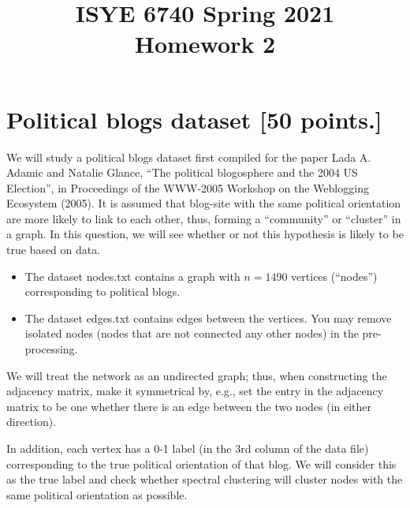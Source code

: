 \documentclass[twoside,10pt]{article}
\begin{document}
\title{ISYE 6740 Spring 2021\\ Homework 2}
\date{}

\maketitle




\section{Political blogs dataset [50 points.]}

We will study a political blogs dataset first compiled for the paper Lada A. Adamic and Natalie Glance, ``The political blogosphere and the 2004 US Election'', in Proceedings of the WWW-2005 Workshop on the Weblogging Ecosystem (2005). It is assumed that blog-site with the same political orientation are more likely to link to each other, thus, forming a ``community'' or ``cluster'' in a graph. In this question, we will see whether or not this hypothesis is likely to be true based on data.
\begin{itemize}

\item The dataset \textsf{nodes.txt} contains a graph with $n = 1490$ vertices (``nodes'') corresponding to political blogs. 

\item The dataset \textsf{edges.txt} contains edges between the vertices. You may remove isolated nodes (nodes that are not connected any other nodes) in the pre-processing. 

\end{itemize}

We will treat the network as an undirected graph; thus, when constructing the adjacency matrix, make it symmetrical by, e.g., set the entry in the adjacency matrix to be one whether there is an edge between the two nodes (in either direction). 

In addition, each vertex has a 0-1 label (in the 3rd column of the data file) corresponding to the true political orientation of that blog. We will consider this as the true label and check whether spectral clustering will cluster nodes with the same political orientation as possible. 
\end{document}
